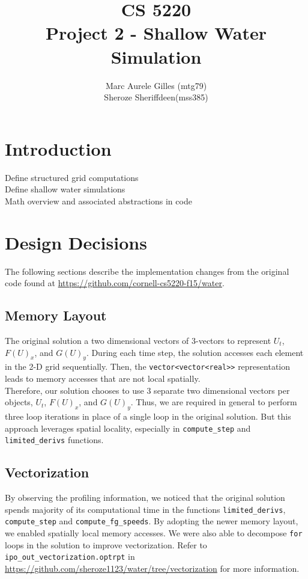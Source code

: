 \documentclass[11pt]{article}
\begin{document}
\title{CS 5220\\ Project 2 - Shallow Water Simulation}
\author{Marc Aurele Gilles (mtg79)\\ Sheroze Sheriffdeen(mss385)}
\maketitle

\section{Introduction}
Define structured grid computations \\
Define shallow water simulations \\
Math overview and associated abstractions in code\\

\section{Design Decisions}

The following sections describe the implementation changes from the original code found at \url{https://github.com/cornell-cs5220-f15/water}.

\subsection{Memory Layout}
The original solution a two dimensional vectors of 3-vectors to represent $U_t$, $F(U)_x$, and $G(U)_y$. During each time step, the solution accesses each element in the 2-D grid sequentially. Then, the \texttt{vector<vector<real>>} representation leads to memory accesses that are not local spatially. \\

Therefore, our solution chooses to use 3 separate two dimensional vectors per objects, $U_t$, $F(U)_x$, and $G(U)_y$. Thus, we are required in general to perform three loop iterations in place of a single loop in the original solution. But this approach leverages spatial locality, especially in \texttt{compute\_step} and \texttt{limited\_derivs} functions.

\subsection{Vectorization}

By observing the profiling information, we noticed that the original solution spends majority of its computational time in the functions \texttt{limited\_derivs}, \texttt{compute\_step} and \texttt{compute\_fg\_speeds}. By adopting the newer memory layout, we enabled spatially local memory accesses. We were also able to decompose \texttt{for} loops in the solution to improve vectorization. Refer to \texttt{ipo\_out\_vectorization.optrpt} in \url{https://github.com/sheroze1123/water/tree/vectorization} for more information. \\
\end{document}
